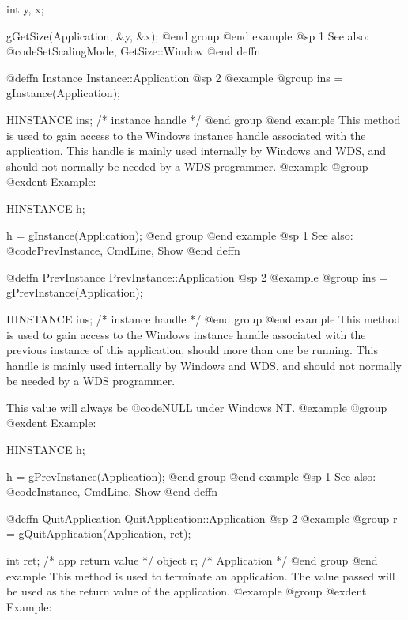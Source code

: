 int     y, x;

gGetSize(Application, &y, &x);
@end group
@end example
@sp 1
See also:  @code{SetScalingMode, GetSize::Window}
@end deffn













@deffn {Instance} Instance::Application
@sp 2
@example
@group
ins = gInstance(Application);

HINSTANCE  ins;    /*  instance handle   */
@end group
@end example
This method is used to gain access to the Windows instance handle
associated with the application.  This handle is mainly used internally
by Windows and WDS, and should not normally be needed by a WDS
programmer.
@example
@group
@exdent Example:

HINSTANCE  h;

h = gInstance(Application);
@end group
@end example
@sp 1
See also:  @code{PrevInstance, CmdLine, Show}
@end deffn











@deffn {PrevInstance} PrevInstance::Application
@sp 2
@example
@group
ins = gPrevInstance(Application);

HINSTANCE  ins;    /*  instance handle   */
@end group
@end example
This method is used to gain access to the Windows instance handle
associated with the previous instance of this application, should more
than one be running.  This handle is mainly used internally by Windows
and WDS, and should not normally be needed by a WDS programmer.

This value will always be @code{NULL} under Windows NT.
@example
@group
@exdent Example:

HINSTANCE  h;

h = gPrevInstance(Application);
@end group
@end example
@sp 1
See also:  @code{Instance, CmdLine, Show}
@end deffn









@deffn {QuitApplication} QuitApplication::Application
@sp 2
@example
@group
r = gQuitApplication(Application, ret);

int     ret;    /*  app return value  */
object  r;      /*  Application       */
@end group
@end example
This method is used to terminate an application.  The value passed will
be used as the return value of the application.
@example
@group
@exdent Example:

